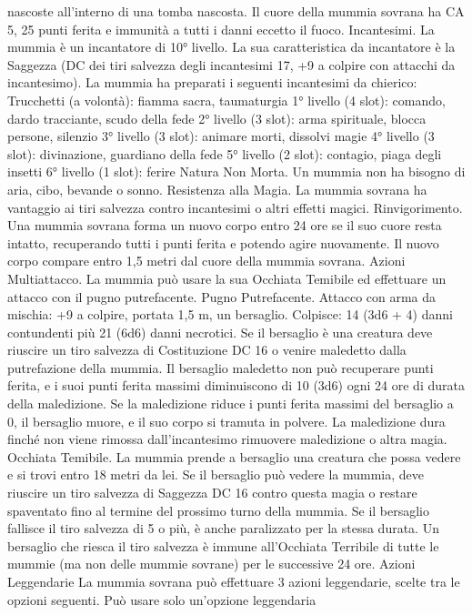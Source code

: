 \begin{multicols}{2}
nascoste all’interno di una tomba nascosta.
Il cuore della mummia sovrana ha CA 5, 25 punti ferita e
immunità a tutti i danni eccetto il fuoco.
Incantesimi. La mummia è un incantatore di 10° livello. La sua
caratteristica da incantatore è la Saggezza (DC dei tiri salvezza
degli incantesimi 17, +9 a colpire con attacchi da incantesimo).
La mummia ha preparati i seguenti incantesimi da chierico:
Trucchetti (a volontà): fiamma sacra, taumaturgia
1° livello (4 slot): comando, dardo tracciante, scudo della fede
2° livello (3 slot): arma spirituale, blocca persone, silenzio
3° livello (3 slot): animare morti, dissolvi magie
4° livello (3 slot): divinazione, guardiano della fede
5° livello (2 slot): contagio, piaga degli insetti
6° livello (1 slot): ferire
Natura Non Morta. Un mummia non ha bisogno di aria, cibo,
bevande o sonno.
Resistenza alla Magia. La mummia sovrana ha vantaggio ai tiri
salvezza contro incantesimi o altri effetti magici.
Rinvigorimento. Una mummia sovrana forma un nuovo corpo
entro 24 ore se il suo cuore resta intatto, recuperando tutti i punti
ferita e potendo agire nuovamente. Il nuovo corpo compare entro
1,5 metri dal cuore della mummia sovrana.
Azioni
Multiattacco. La mummia può usare la sua Occhiata Temibile ed
effettuare un attacco con il pugno putrefacente.
Pugno Putrefacente. Attacco con arma da mischia: +9 a colpire,
portata 1,5 m, un bersaglio.
Colpisce: 14 (3d6 + 4) danni contundenti più 21 (6d6) danni
necrotici. Se il bersaglio è una creatura deve riuscire un tiro
salvezza di Costituzione DC 16 o venire maledetto dalla
putrefazione della mummia. Il bersaglio maledetto non può
recuperare punti ferita, e i suoi punti ferita massimi diminuiscono
di 10 (3d6) ogni 24 ore di durata della maledizione. Se la
maledizione riduce i punti ferita massimi del bersaglio a 0, il
bersaglio muore, e il suo corpo si tramuta in polvere. La
maledizione dura finché non viene rimossa dall’incantesimo
rimuovere maledizione o altra magia.
Occhiata Temibile. La mummia prende a bersaglio una creatura
che possa vedere e si trovi entro 18 metri da lei. Se il bersaglio
può vedere la mummia, deve riuscire un tiro salvezza di
Saggezza DC 16 contro questa magia o restare spaventato fino al
termine del prossimo turno della mummia. Se il bersaglio fallisce
il tiro salvezza di 5 o più, è anche paralizzato per la stessa durata.
Un bersaglio che riesca il tiro salvezza è immune all’Occhiata
Terribile di tutte le mummie (ma non delle mummie sovrane) per
le successive 24 ore.
Azioni Leggendarie
La mummia sovrana può effettuare 3 azioni leggendarie, scelte
tra le opzioni seguenti. Può usare solo un’opzione leggendaria

\end{multicols}
